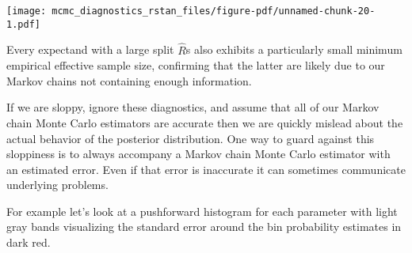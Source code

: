 \documentclass[
  letterpaper,
  DIV=11,
  numbers=noendperiod]{scrartcl}
\newenvironment{Shaded}{\begin{snugshade}}{\end{snugshade}}
\newcommand{\AttributeTok}[1]{\textcolor[rgb]{0.40,0.45,0.13}{#1}}
\newcommand{\DecValTok}[1]{\textcolor[rgb]{0.68,0.00,0.00}{#1}}
\newcommand{\FunctionTok}[1]{\textcolor[rgb]{0.28,0.35,0.67}{#1}}
\newcommand{\NormalTok}[1]{\textcolor[rgb]{0.00,0.23,0.31}{#1}}
\newcommand{\SpecialCharTok}[1]{\textcolor[rgb]{0.37,0.37,0.37}{#1}}
\newcommand{\StringTok}[1]{\textcolor[rgb]{0.13,0.47,0.30}{#1}}
\begin{document}
\texttt{[image: mcmc\_diagnostics\_rstan\_files/figure-pdf/unnamed-chunk-20-1.pdf]}

Every expectand with a large split \(\hat{R}\)s also exhibits a
particularly small minimum empirical effective sample size, confirming
that the latter are likely due to our Markov chains not containing
enough information.

If we are sloppy, ignore these diagnostics, and assume that all of our
Markov chain Monte Carlo estimators are accurate then we are quickly
mislead about the actual behavior of the posterior distribution. One way
to guard against this sloppiness is to always accompany a Markov chain
Monte Carlo estimator with an estimated error. Even if that error is
inaccurate it can sometimes communicate underlying problems.

For example let's look at a pushforward histogram for each parameter
with light gray bands visualizing the standard error around the bin
probability estimates in dark red.

\begin{Shaded}
\end{Shaded}
\end{document}
